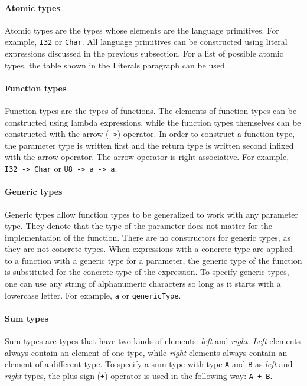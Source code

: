 \documentclass[12pt]{article}
\begin{document}
\paragraph{Atomic types} Atomic types are the types whose elements are the
language primitives. For example, \verb$I32$ or \verb$Char$. All language
primitives can be constructed using literal expressions discussed in the
previous subsection. For a list of possible atomic types, the table shown in the
Literals paragraph can be used.

\paragraph{Function types} Function types are the types of functions. The
elements of function types can be constructed using lambda expressions, while
the function types themselves can be constructed with the arrow (\verb$->$)
operator. In order to construct a function type, the parameter type is written
first and the return type is written second infixed with the arrow operator. The
arrow operator is right-associative. For example, \verb$I32 -> Char$ or 
\verb$U8 -> a -> a$.

\paragraph{Generic types} Generic types allow function types to be generalized
to work with any parameter type. They denote that the type of the parameter does
not matter for the implementation of the function. There are no constructors for
generic types, as they are not concrete types. When expressions with a concrete
type are applied to a function with a generic type for a parameter, the generic
type of the function is substituted for the concrete type of the expression. To
specify generic types, one can use any string of alphanumeric characters so long
as it starts with a lowercase letter. For example, \verb$a$ or
\verb$genericType$.

\paragraph{Sum types} Sum types are types that have two kinds of elements:
\emph{left} and \emph{right}. \emph{Left} elements always contain an element of
one type, while \emph{right} elements always contain an element of a different
type. To specify a sum type with type \verb$A$ and \verb$B$ as \emph{left} and
\emph{right} types, the plus-sign (\verb$+$) operator is used in the
following way: \verb$A + B$.
\end{document}
